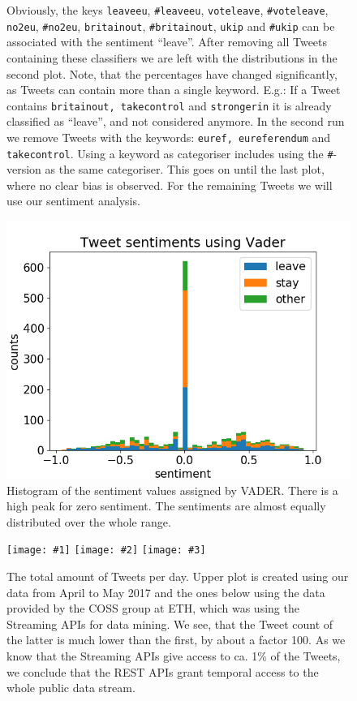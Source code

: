 \documentclass{emulateapj}
\makeatletter
\newcommand\plotthree[3]{ %
  \centering
  \leavevmode
  \setlength{\plot@width}{0.3\linewidth}
  \texttt{[image: \#1]}%
  \hfill
  \texttt{[image: \#2]}%
  \hfill
  \texttt{[image: \#3]}%
}%
\makeatother
\begin{document}
\begin{appendix}
\begin{figure}
{  Obviously, the keys \texttt{leaveeu}, \texttt{\#leaveeu}, \texttt{voteleave}, \texttt{\#voteleave},
  \texttt{no2eu}, \texttt{\#no2eu}, \texttt{britainout}, \texttt{\#britainout}, \texttt{ukip} and \texttt{\#ukip}
  can be associated with the sentiment ``leave''.
  After removing all Tweets containing these classifiers we are left with the distributions in the second plot.
  Note, that the percentages have changed significantly, as Tweets can contain more than a single keyword.
  E.g.: If a Tweet contains \texttt{britainout, takecontrol} and \texttt{strongerin} it is already classified as ``leave'',
  and not considered anymore.
  In the second run we remove Tweets with the keywords: \texttt{euref, eureferendum} and \texttt{takecontrol}.
  Using a keyword as categoriser includes using the \texttt{\#}-version as the same categoriser.
  This goes on until the last plot, where no clear bias is observed. 
  For the remaining Tweets we will use our sentiment analysis.
  \label{fig:keywords}}
\end{figure}

\begin{figure} %
  \centering
  \includegraphics[width=0.5\linewidth]{img/vader_hist.png}
  \caption{Histogram of the sentiment values assigned by VADER.
  There is a high peak for zero sentiment. 
  The sentiments are almost equally distributed over the whole range. 
  \label{fig:vader-hist}}
\end{figure}
\begin{figure}
  \plotthree{./img/feb16/frequency_brexit}{./img/apr16/frequency_brexit}{./img/may16/frequency_brexit}
  \caption{The total amount of Tweets per day. Upper plot is created using our data from April to May 2017 and the ones below using the data provided by 
           the COSS group at ETH, which was using the Streaming APIs for data mining. 
           We see, that the Tweet count of the latter is much lower than the first, by about a factor 100.
           As we know that the Streaming APIs give access to ca. 1\% of the Tweets, we conclude that the REST APIs grant temporal access to the whole public data stream.
           \label{fig:freqbrexit}}
\end{figure}


\end{appendix}
\end{document}
